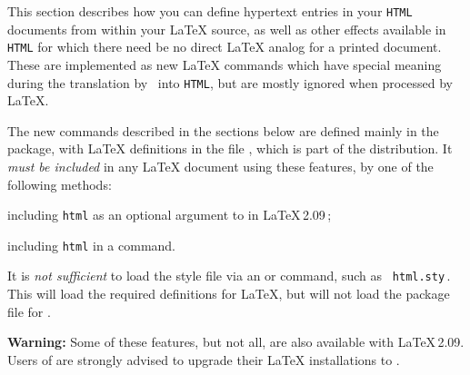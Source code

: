 \startdocument
%
\label{sec:hyp}

\noindent
This {section} describes how you can define hypertext 
entries in your \texttt{HTML} documents from within your \LaTeX{} source,
as well as other effects available in \texttt{HTML} for which
there need be no direct \LaTeX{} analog for a printed document.
These are implemented as new \LaTeX{} commands which have special 
meaning during the translation by \latextohtml\ into \texttt{HTML}, 
but are mostly ignored when processed by \LaTeX.

%
\html{\\}%
The new commands described in the sections 
below are defined mainly in the  package,
with \LaTeX{} definitions in the file ,
which is part of the \latextohtml{} distribution. 
It \emph{must be included} in any \LaTeX{} document using these features, 
by one of the following methods:%
\begin{itemize}%
\begin{changebar}
\item including \texttt{html} as an optional argument 
to  in \LaTeX\,2.09\,;
\item including \texttt{html} in a \LaTeXe{}  command.
\end{changebar}%
\end{itemize}
It is \emph{not sufficient} to load the style file via an  or
 command, such as \verb| html.sty|\,.
This will load the required definitions for \LaTeX, but will not load
the  package file for \latextohtml.

\smallskip\noindent
\textbf{Warning: } Some of these features, but not all, are also available
with \LaTeX{}\,2.09.\html{\\}
Users of \latextohtml{} are strongly advised to upgrade
their \LaTeX{} installations to \LaTeXe{}. 

